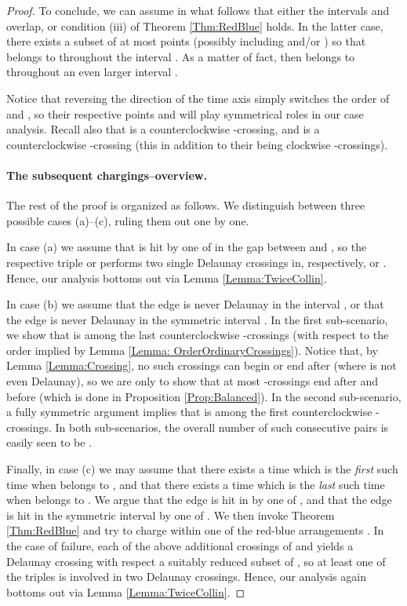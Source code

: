 \documentclass[letter,11pt]{article}
\begin{document}
\begin{proof}
To conclude, we can assume in what follows that either the intervals  and  overlap, or condition (iii) of Theorem \ref{Thm:RedBlue} holds. In the latter case, there exists a subset  of at most  points (possibly including  and/or ) so that  belongs to  throughout the interval . As a matter of fact,  then belongs to  throughout an even larger interval . 


Notice that reversing the direction of the time axis simply switches the order of  and , so their respective points  and  will play symmetrical roles in our case analysis. Recall also that  is a counterclockwise -crossing, and  is a counterclockwise -crossing (this in addition to their being clockwise -crossings).

\paragraph{The subsequent chargings--overview.} The rest of the proof is organized as follows.
We distinguish between three possible cases (a)--(c), ruling them out one by one.

In case (a) we assume that  is hit by one of  in the gap  between  and , so the respective triple  or  performs two single Delaunay crossings in, respectively,  or . Hence, our analysis bottoms out via Lemma \ref{Lemma:TwiceCollin}.


In case (b) we assume that the edge  is never Delaunay in the interval , or that the edge  is never Delaunay in the symmetric interval .
In the first sub-scenario, we show that  is among the last  counterclockwise -crossings (with respect to the order implied by Lemma \ref{Lemma: OrderOrdinaryCrossings}). Notice that, by Lemma \ref{Lemma:Crossing}, no such crossings can begin or end after  (where  is not even Delaunay), so we are only to show that at most  -crossings  end after  and before  (which is done in Proposition \ref{Prop:Balanced}).
In the second sub-scenario, a fully symmetric argument implies that  is among the first  counterclockwise -crossings. In both sub-scenarios, the overall number of such consecutive pairs  is easily seen to be .
 
Finally, in case (c) we may assume that there exists a time  which is the {\it first} such time when  belongs to , and that
there exists a time  which is the {\it last} such time when  belongs to .
We argue that the edge  is hit in  by one of , and that the edge  is hit in the symmetric interval  by one of .
We then invoke Theorem \ref{Thm:RedBlue} and try to charge  within one of the red-blue arrangements . In the case of failure, each of the above additional crossings of  and  yields a Delaunay crossing with respect a suitably reduced subset of , so at least one of the triples  is involved in two Delaunay crossings. Hence, our analysis again bottoms out via Lemma \ref{Lemma:TwiceCollin}.










\end{proof}
\end{document}
